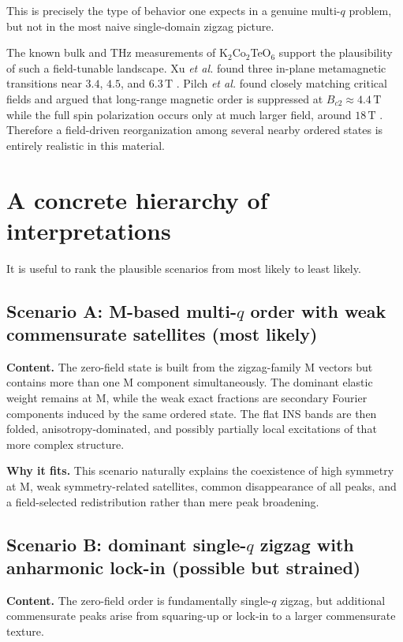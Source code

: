 \documentclass[11pt]{article}
\begin{document}
This is precisely the type of behavior one expects in a genuine multi-$q$ problem, but not in the most naive single-domain zigzag picture.

The known bulk and THz measurements of K$_2$Co$_2$TeO$_6$ support the plausibility of such a field-tunable landscape. Xu \emph{et al.} found three in-plane metamagnetic transitions near \(3.4\), \(4.5\), and \(6.3\,\mathrm{T}\) \cite{Xu2023K2Co2TeO6}. Pilch \emph{et al.} found closely matching critical fields and argued that long-range magnetic order is suppressed at \(B_{c2}\approx 4.4\,\mathrm{T}\) while the full spin polarization occurs only at much larger field, around \(18\,\mathrm{T}\) \cite{Pilch2025K2Co2TeO6THz}. Therefore a field-driven reorganization among several nearby ordered states is entirely realistic in this material.

\section{A concrete hierarchy of interpretations}

It is useful to rank the plausible scenarios from most likely to least likely.

\subsection*{Scenario A: M-based multi-$q$ order with weak commensurate satellites \hfill (most likely)}

\textbf{Content.} The zero-field state is built from the zigzag-family M vectors but contains more than one M component simultaneously. The dominant elastic weight remains at M, while the weak exact fractions are secondary Fourier components induced by the same ordered state. The flat INS bands are then folded, anisotropy-dominated, and possibly partially local excitations of that more complex structure.

\textbf{Why it fits.} This scenario naturally explains the coexistence of high symmetry at M, weak symmetry-related satellites, common disappearance of all peaks, and a field-selected redistribution rather than mere peak broadening.

\subsection*{Scenario B: dominant single-$q$ zigzag with anharmonic lock-in \hfill (possible but strained)}

\textbf{Content.} The zero-field order is fundamentally single-$q$ zigzag, but additional commensurate peaks arise from squaring-up or lock-in to a larger commensurate texture.
\end{document}

